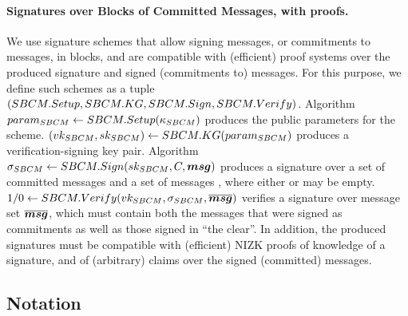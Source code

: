 \paragraph{Signatures over Blocks of Committed Messages, with proofs.} %
We use signature schemes that allow signing messages, or commitments to messages,
in blocks, and are compatible with (efficient) proof systems over the produced
signature and signed (commitments to) messages. For this purpose, we define such
schemes as a tuple $(SBCM.Setup,SBCM.KG,SBCM.Sign,SBCM.Verify)$. Algorithm
$param_{SBCM} \gets SBCM.Setup(\kappa_{SBCM})$ produces the public parameters for the
scheme. $(vk_{SBCM},sk_{SBCM}) \gets SBCM.KG(param_{SBCM})$ produces a
verification-signing key
pair. Algorithm $\sigma_{SBCM} \gets SBCM.Sign(sk_{SBCM},C,\boldsymbol{msg})$ produces a
signature over a set of committed messages \Ccom and a set of messages
\msgset, where either \Ccom or \msgset may be empty. $1/0 \gets
SBCM.Verify(vk_{SBCM},\sigma_{SBCM},\overline{\boldsymbol{msg}})$ verifies a signature \SBCMsig
over message set $\overline{\boldsymbol{msg}}$, which must contain both the messages that
were signed as commitments as well as those signed in ``the clear''. In
addition, the produced signatures must be compatible with (efficient) NIZK
proofs of knowledge of a signature, and of (arbitrary) claims over the signed
(committed) messages.

\subsection{Notation}
\label{ssec:notation}




  

